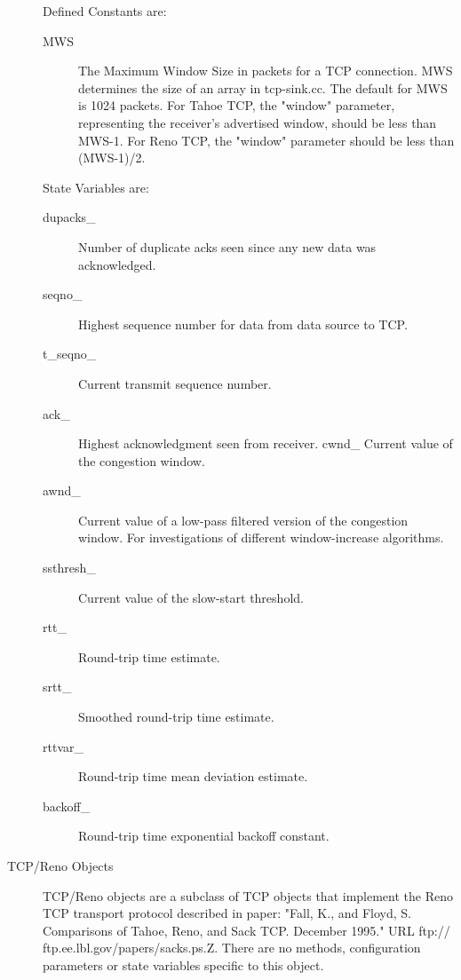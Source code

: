 \begin{description}
Defined Constants are:
\begin{description}
\item[MWS] The Maximum Window Size in packets for a TCP connection. MWS
determines the size of an array in tcp-sink.cc. The default for MWS is
1024 packets. For Tahoe TCP, the "window" parameter, representing the
receiver's advertised window, should be less than MWS-1. For Reno TCP, the
"window" parameter should be less than (MWS-1)/2. 
\end{description}

State Variables are:
\begin{description}

\item[dupacks\_]
Number of duplicate acks seen since any new data was acknowledged. 

\item[seqno\_]
Highest sequence number for data from data source to TCP. 

\item[t\_seqno\_]
Current transmit sequence number. 

\item[ack\_] Highest acknowledgment seen from receiver. cwnd\_
Current value of the congestion window. 

\item[awnd\_]
Current value of a low-pass filtered version of the congestion window. For
investigations of different window-increase algorithms. 

\item[ssthresh\_]
Current value of the slow-start threshold. 

\item[rtt\_] Round-trip time estimate. 

\item[srtt\_]
Smoothed round-trip time estimate. 

\item[rttvar\_]
Round-trip time mean deviation estimate. 

\item[backoff\_]
Round-trip time exponential backoff constant. 
\end{description}

\item[TCP/Reno Objects]
TCP/Reno objects are a subclass of TCP objects that implement the Reno TCP
transport protocol described in paper: "Fall, K., and Floyd, S.
Comparisons of Tahoe, Reno, and Sack TCP. December 1995." URL ftp://
ftp.ee.lbl.gov/papers/sacks.ps.Z. There are no methods,
configuration parameters or state variables specific to this object. 


\end{description}
